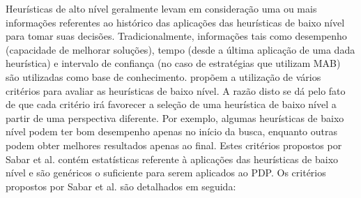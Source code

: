 Heurísticas de alto nível geralmente levam em consideração uma ou mais informações referentes ao histórico das aplicações das heurísticas de baixo nível para tomar suas decisões. Tradicionalmente, informações tais como desempenho (capacidade de melhorar soluções), tempo (desde a última aplicação de uma dada heurística) e intervalo de confiança (no caso de estratégias que utilizam MAB) são utilizadas como base de conhecimento. \cite{sabar2015automatic} propõem a utilização de vários critérios para avaliar as heurísticas de baixo nível. A razão disto se dá pelo fato de que cada critério irá favorecer a seleção de uma heurística de baixo nível a partir de uma perspectiva diferente. Por exemplo, algumas heurísticas de baixo nível podem ter bom desempenho apenas no início da busca, enquanto outras podem obter melhores resultados apenas ao final. Estes critérios propostos por Sabar et al. \cite{sabar2015automatic} contém estatísticas referente à aplicações das heurísticas de baixo nível e são genéricos o suficiente para serem aplicados ao PDP. Os critérios propostos por Sabar et al. \cite{sabar2015automatic} são detalhados em seguida:


